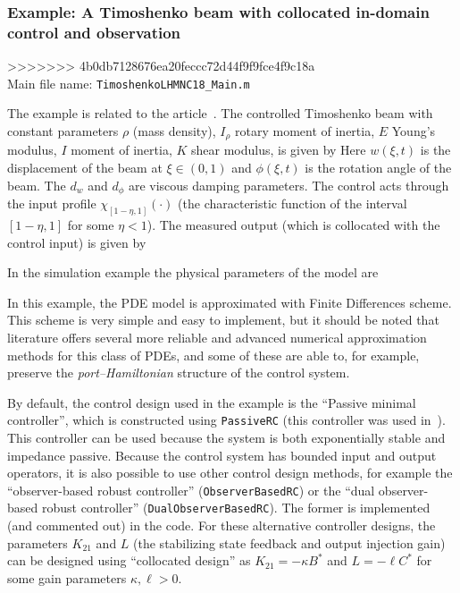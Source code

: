 \documentclass[11pt, a4paper]{amsart}
\theoremstyle{definition}
\numberwithin{equation}{section}
\begin{document}
\medskip

\subsubsection*{Example: A Timoshenko beam with collocated in-domain control and observation}
>>>>>>> 4b0db7128676ea20feccc72d44f9f9fce4f9c18a
~\\[-1ex]

\noindent Main file name: \texttt{TimoshenkoLHMNC18\_Main.m}

\medskip

The example is related to the article~\cite{PauLeGLHMNC18}.
The controlled Timoshenko beam with constant parameters $\rho$ (mass density), $I_\rho$ rotary moment of inertia, $E$  Young's modulus, $I$ moment of inertia, $K$ shear modulus, is given by
Here $w(\xi,t)$ is the displacement of the beam at $\xi\in(0,1)$ and $\phi(\xi,t)$ is the rotation angle of the beam. The $d_w$ and $d_\phi$ are viscous damping parameters. 
The control acts through the input profile $\chi_{[1-\eta,1]}(\cdot)$ (the characteristic function of the interval $[1-\eta,1]$ for some $\eta<1$).
The measured output (which is collocated with the control input) is given by

In the simulation example the physical parameters of the model are 

In this example, the PDE model is approximated with Finite Differences scheme. This scheme is very simple and easy to implement, but it should be noted that literature offers several more reliable and advanced numerical approximation methods for this class of PDEs, and some of these are able to, for example, preserve the \emph{port--Hamiltonian} structure of the control system.

By default, the control design used in the example is the ``Passive minimal controller'', which is constructed using \texttt{PassiveRC} (this controller was used in~\cite{PauLeGLHMNC18}). This controller can be used because the system is both exponentially stable and impedance passive.
Because the control system has bounded input and output operators, it is also possible to use other control design methods, for example the ``observer-based robust controller'' (\texttt{ObserverBasedRC}) or the ``dual observer-based robust controller'' (\texttt{DualObserverBasedRC}). The former is implemented (and commented out) in the code. For these alternative controller designs, the parameters $K_{21}$ and $L$ (the stabilizing state feedback and output injection gain) can be designed using ``collocated design'' as $K_{21} = -\kappa B^\ast$ and $L=-\ell C^\ast$ for some gain parameters $\kappa,\ell>0$.
\end{document}
